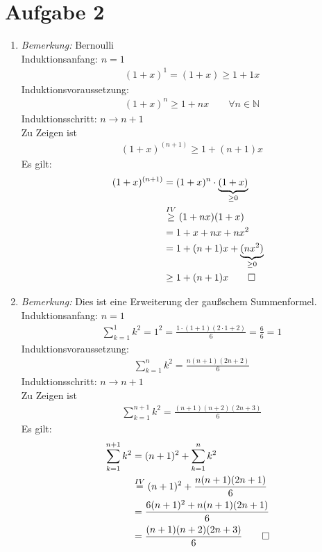\section{Aufgabe 2}
    \begin{enumerate}[label={\alph*)}]
      \item
      \textit{Bemerkung:} Bernoulli\\
      Induktionsanfang: $n=1$ \begin{align*}&(1+x)^{1}=(1+x) \geq 1+1x\end{align*}
      Induktionsvoraussetzung: \begin{align*}&(1+x)^{n} \geq 1+nx\qquad \forall n \in \mathbb{N}\end{align*}
      Induktionsschritt: $n\rightarrow n+1$ \\
      Zu Zeigen ist \begin{align*}&(1+x)^{(n+1)} \geq 1+(n+1)x\end{align*}
      Es gilt: \begin{align*}(1+x)^{(n+1)}& =(1+x)^n\cdot \underbrace{(1+x)}_{\geq0}\\ &\overset{IV}{\geq}(1+nx)(1+x)\\ &=1+x+nx+nx^2\\ &=1+(n+1)x+\underbrace{(nx^2)}_{\geq0}\\ &\geq 1+(n+1)x\qed\end{align*}
      \item
      \textit{Bemerkung:} Dies ist eine Erweiterung der gaußschem Summenformel.\\
      Induktionsanfang: $n=1$ \begin{align*}&\sum_{k=1}^{1}k^2=1^2=\frac{1\cdot (1+1)(2\cdot 1+2)}{6}=\frac{6}{6}=1\end{align*}
      Induktionsvoraussetzung: \begin{align*}&\sum_{k=1}^{n}k^2=\frac{n(n+1)(2n+2)}{6}\end{align*}
      Induktionsschritt: $n\rightarrow n+1$ \\
      Zu Zeigen ist \begin{align*}&\sum_{k=1}^{n+1}k^2=\frac{(n+1)(n+2)(2n+3)}{6}\end{align*}
      Es gilt: \begin{align*}\sum_{k=1}^{n+1}k^2& =(n+1)^2+\sum_{k=1}^{n}k^2\\ &\overset{IV}{=}(n+1)^2+\frac{n(n+1)(2n+1)}{6}\\ &=\frac{6(n+1)^2+n(n+1)(2n+1)}{6}\\ &=\frac{(n+1)(n+2)(2n+3)}{6}\qed\end{align*}
    \end{enumerate}

